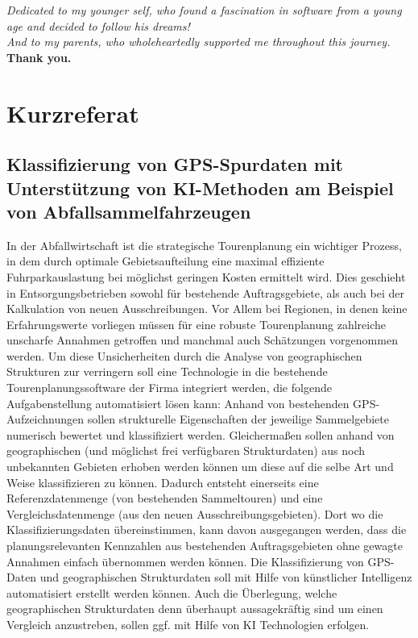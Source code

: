 \documentclass[a4paper,12pt,twoside]{scrreprt}
\begin{document}
\vspace{1cm}
\begin{center}
  \emph{Dedicated to my younger self, who found a fascination in software from
    a young age and decided to follow his dreams!}\\[0.5cm]
  \emph{And to my parents, who wholeheartedly supported me throughout this
    journey.}\\[0.5cm]
  \textbf{Thank you.}
\end{center}
\vspace{1cm}

\newpage
\section*{Kurzreferat}

\subsection*{Klassifizierung von GPS-Spurdaten mit Unterstützung von
  KI-Methoden am Beispiel von Abfallsammelfahrzeugen}

In der Abfallwirtschaft ist die strategische Tourenplanung ein wichtiger
Prozess, in dem durch optimale Gebietsaufteilung eine maximal effiziente
Fuhrparkauslastung bei möglichst geringen Kosten ermittelt wird. Dies geschieht
in Entsorgungsbetrieben sowohl für bestehende Auftragsgebiete, als auch bei der
Kalkulation von neuen Ausschreibungen. Vor Allem bei Regionen, in denen keine
Erfahrungswerte vorliegen müssen für eine robuste Tourenplanung zahlreiche
unscharfe Annahmen getroffen und manchmal auch Schätzungen vorgenommen werden.
Um diese Unsicherheiten durch die Analyse von geographischen Strukturen zur
verringern soll eine Technologie in die bestehende Tourenplanungssoftware der
Firma integriert werden, die folgende Aufgabenstellung automatisiert lösen
kann: Anhand von bestehenden GPS-Aufzeichnungen sollen strukturelle
Eigenschaften der jeweilige Sammelgebiete numerisch bewertet und klassifiziert
werden. Gleichermaßen sollen anhand von geographischen (und möglichst frei
verfügbaren Strukturdaten) aus noch unbekannten Gebieten erhoben werden können
um diese auf die selbe Art und Weise klassifizieren zu können. Dadurch entsteht
einerseits eine Referenzdatenmenge (von bestehenden Sammeltouren) und eine
Vergleichsdatenmenge (aus den neuen Ausschreibungsgebieten). Dort wo die
Klassifizierungsdaten übereinstimmen, kann davon ausgegangen werden, dass die
planungsrelevanten Kennzahlen aus bestehenden Auftragsgebieten ohne gewagte
Annahmen einfach übernommen werden können. Die Klassifizierung von GPS-Daten
und geographischen Strukturdaten soll mit Hilfe von künstlicher Intelligenz
automatisiert erstellt werden können. Auch die Überlegung, welche
geographischen Strukturdaten denn überhaupt aussagekräftig sind um einen
Vergleich anzustreben, sollen ggf. mit Hilfe von KI Technologien erfolgen.
\end{document}

